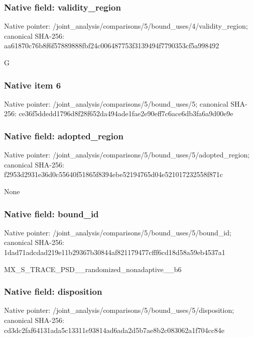 \documentclass[10pt,a4paper]{article}
\begin{document}
\subsubsection{Native field: validity\_\allowbreak{}region}
Native pointer: /joint\_\allowbreak{}analysis/comparisons/5/bound\_\allowbreak{}uses/4/validity\_\allowbreak{}region; canonical SHA-256: aa61870c76b8f6f57889888fbf24c006487753f3139494f7790353cf5a998492

\begingroup\raggedright\sloppy G\par\endgroup

\subsubsection{Native item 6}
Native pointer: /joint\_\allowbreak{}analysis/comparisons/5/bound\_\allowbreak{}uses/5; canonical SHA-256: ce36f5ddedd1796d8f28f652da494ade1fae2e90eff7c6ace6db3fa6a9d00e9e

\subsubsection{Native field: adopted\_\allowbreak{}region}
Native pointer: /joint\_\allowbreak{}analysis/comparisons/5/bound\_\allowbreak{}uses/5/adopted\_\allowbreak{}region; canonical SHA-256: f2953d2931e36d0c55640f51865f8394ebe52194765d04e521017232558f871c

\begingroup\raggedright\sloppy None\par\endgroup

\subsubsection{Native field: bound\_\allowbreak{}id}
Native pointer: /joint\_\allowbreak{}analysis/comparisons/5/bound\_\allowbreak{}uses/5/bound\_\allowbreak{}id; canonical SHA-256: 1dad71adcdad219e11b29367b30844af821179477cfff6cd18d58a59eb4537a1

\begingroup\raggedright\sloppy MX\_\allowbreak{}S\_\allowbreak{}TRACE\_\allowbreak{}PSD\_\allowbreak{}\_\allowbreak{}randomized\_\allowbreak{}nonadaptive\_\allowbreak{}\_\allowbreak{}b6\par\endgroup

\subsubsection{Native field: disposition}
Native pointer: /joint\_\allowbreak{}analysis/comparisons/5/bound\_\allowbreak{}uses/5/disposition; canonical SHA-256: cd3dc2faf64131ada5c13311e93814ad6ada2d5b7ae8b2c083062a1f704cc84e
\end{document}
